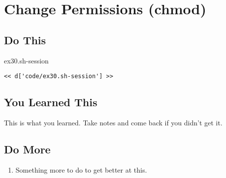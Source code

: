 \chapter{Change Permissions (chmod)}

\section{Do This}

\begin{code}{ex30.sh-session}
\begin{Verbatim}
<< d['code/ex30.sh-session'] >>
\end{Verbatim}
\end{code}


\section{You Learned This}

This is what you learned.  Take notes and come back if you didn't get it.

\section{Do More}

\begin{enumerate}
\item Something more to do to get better at this.
\end{enumerate}

